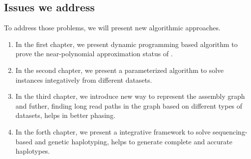 \subsection{Issues we address}
To address those problems, we will present new algorithmic approaches. 
\begin{enumerate}
 \item In the first chapter, we present dynamic programming based algorithm to prove the near-polynomial approximation status of \GMEC.
 \item In the second chapter, we present a parameterized algorithm to solve \MEC instances integatively from different datasets.
 \item In the third chapter, we introduce new way to represent the assembly graph and futher, finding long read paths in the graph based on different types of datasets, helps in better phasing. 
 \item In the forth chapter, we present a integrative framework to solve sequencing-based and genetic haplotyping, helps to generate complete and accurate haplotypes.
\end{enumerate}


